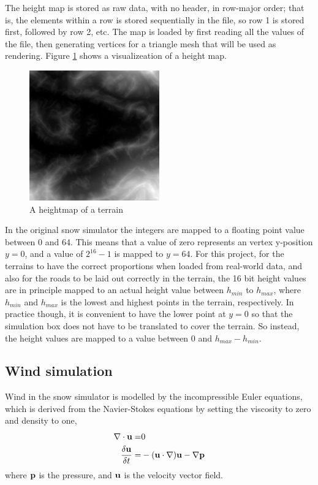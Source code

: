 The height map is stored as raw data, with no header, in row-major order; that is, the elements within a row is stored sequentially in the file, so row 1 is stored first, followed by row 2, etc. The map is loaded by first reading all the values of the file, then generating vertices for a triangle mesh that will be used as rendering. Figure \ref{fig:heightmap} shows a visualizeation of a height map.

\begin{figure}[ht]
\centering
\includegraphics[width=0.5\textwidth]{figure/heightmap}
\caption{A heightmap of a terrain}
\label{fig:heightmap}
\end{figure}

In the original snow simulator the integers are mapped to a floating point value between 0 and 64. This means that a value of zero represents an vertex y-position $y=0$, and a value of $2^{16}-1$ is mapped to $y=64$. For this project, for the terrains to have the correct proportions when loaded from real-world data, and also for the roads to be laid out correctly in the terrain, the 16 bit height values are in principle mapped to an actual height value between $h_{min}$ to $h_{max}$, where $h_{min}$ and $h_{max}$ is the lowest and highest points in the terrain, respectively. In practice though, it is convenient to have the lower point at $y=0$ so that the simulation box does not have to be translated to cover the terrain. So instead, the height values are mapped to a value between $0$ and $h_{max}-h_{min}$.

\subsection{Wind simulation}
Wind in the snow simulator is modelled by the incompressible Euler equations, which is derived from the Navier-Stokes equations by setting the viscosity to zero and density to one,
\begin{align}
\nabla \cdot {\mathbf u} = & 0\\
\frac{\delta{\mathbf u}}{\delta t} = & -({\mathbf u}\cdot \nabla){\mathbf u} - \nabla{\mathbf p}
\end{align}
where ${\mathbf p}$ is the pressure, and ${\mathbf u}$ is the velocity vector field.

